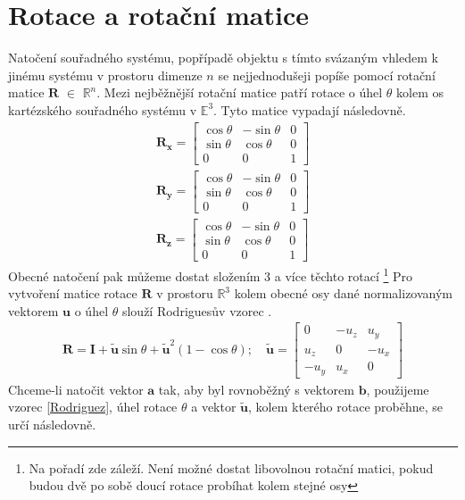 \documentclass[twoside]{ctuthesis}
\newcommand{\spc}[2]{$\mathbb{#1}^{#2}$}
\newcommand{\tl}[1]{$\mathbf{#1}$}
\begin{document}
\section{Rotace a rotační matice}
Natočení souřadného systému, popřípadě objektu s tímto svázaným vhledem k jinému systému v prostoru dimenze $n$ se nejjednodušeji popíše pomocí rotační matice \tl{R} $\in$ \spc{R}{n}. Mezi nejběžnější rotační matice patří rotace o úhel $\theta$ kolem os kartézského souřadného systému v \spc{E}{3}. Tyto matice vypadají následovně.
\begin{align}
    \mathbf{R_x}=\begin{bmatrix} \cos \theta & -\sin \theta & 0 \\ \sin \theta & \cos \theta & 0 \\ 0 & 0 & 1 \end{bmatrix} \\
    \mathbf{R_y}=\begin{bmatrix} \cos \theta & -\sin \theta & 0 \\ \sin \theta & \cos \theta & 0 \\ 0 & 0 & 1 \end{bmatrix} \\
    \mathbf{R_z}=\begin{bmatrix} \cos \theta & -\sin \theta & 0 \\ \sin \theta & \cos \theta & 0 \\ 0 & 0 & 1 \end{bmatrix}
\end{align}
Obecné natočení pak můžeme dostat složením 3 a více těchto rotací \footnote{Na pořadí zde záleží. Není možné dostat libovolnou rotační matici, pokud budou dvě po sobě doucí rotace probíhat kolem stejné osy}
Pro vytvoření matice rotace \tl{R} v prostoru \spc{R}{3} kolem obecné osy dané normalizovaným vektorem \tl{u} o úhel $\theta$ slouží Rodriguesův vzorec \cite{RodriguesRotationFormula}.
\begin{align}
    \mathbf{R} = \mathbf{I} + \tilde{\mathbf{u}}\sin \theta + \tilde{\mathbf{u}}^2(1 - \cos \theta); \quad \tilde{\mathbf{u}} = \begin{bmatrix} 0 & -u_{z} & u_{y} \\ u_z & 0 & -u_x \\ -u_y & u_x & 0 \end{bmatrix}
    \label{Rodriguez}
\end{align}
Chceme-li natočit vektor \tl{a} tak, aby byl rovnoběžný s vektorem \tl{b}, použijeme vzorec \ref{Rodriguez}, úhel rotace $\theta$ a vektor $\tilde{\mathbf{u}}$, kolem kterého rotace proběhne, se určí následovně.
\end{document}
